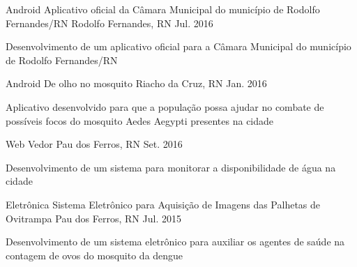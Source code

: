 

\begin{cventries}

  \cventry
    {Android} %
    {Aplicativo oficial da Câmara Municipal do município de Rodolfo Fernandes/RN} %
    {Rodolfo Fernandes, RN} %
    {Jul. 2016} %
    {
      \begin{cvitems} %
        \item {Desenvolvimento de um aplicativo oficial para a Câmara Municipal do município de Rodolfo Fernandes/RN}
      \end{cvitems}
    }

  \cventry
    {Android} %
    {De olho no mosquito} %
    {Riacho da Cruz, RN} %
    {Jan. 2016} %
    {
      \begin{cvitems} %
        \item {Aplicativo desenvolvido para que a população possa ajudar no combate de possíveis focos do mosquito Aedes Aegypti presentes na cidade}
      \end{cvitems}
    }

  \cventry
    {Web} %
    {Vedor} %
    {Pau dos Ferros, RN} %
    {Set. 2016} %
    {
      \begin{cvitems} %
        \item {Desenvolvimento de um sistema para monitorar a disponibilidade de água na cidade}
      \end{cvitems}
    }

  \cventry
    {Eletrônica} %
    {Sistema Eletrônico para Aquisição de Imagens das Palhetas de Ovitrampa} %
    {Pau dos Ferros, RN} %
    {Jul. 2015} %
    {
      \begin{cvitems} %
        \item {Desenvolvimento de um sistema eletrônico para auxiliar os agentes de saúde na contagem de ovos do mosquito da dengue}
      \end{cvitems}
    }

\end{cventries}
